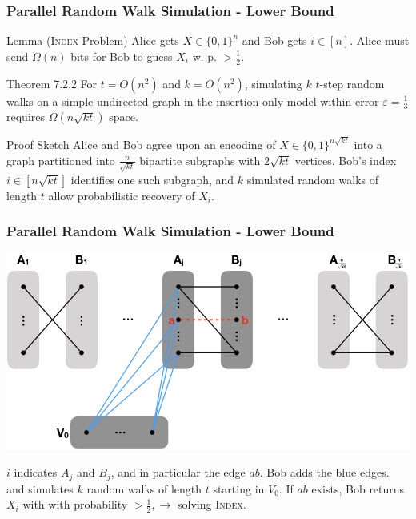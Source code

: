 \documentclass{beamer}
\newcommand{\algoname}[1]{\textnormal{\textsc{#1}}}
\begin{document}
\begin{frame}
\frametitle{Parallel Random Walk Simulation - Lower Bound}

\begin{block}{Lemma (\algoname{Index} Problem)}
Alice gets $X \in \{0,1\}^n$ and Bob gets $i \in [n]$.
Alice must send $\Omega(n)$ bits for Bob to guess $X_i$ w. p. $>\frac{1}{2}$.
\end{block}

\begin{block}{Theorem 7.2.2}
For $t = O(n^2)$ and $k = O(n^2)$, simulating $k$ $t$-step random walks on a simple undirected graph in the insertion-only model within error $\varepsilon = \frac{1}{3}$ requires $\Omega(n\sqrt{kt})$ space.
\end{block}

\begin{block}{Proof Sketch}
Alice and Bob agree upon an encoding of $X \in \{0,1\}^{n\sqrt{kt}}$ into a graph partitioned into $\frac{n}{\sqrt{kt}}$ bipartite subgraphs with $2\sqrt{kt}$ vertices.
Bob's index $i \in \left [ n\sqrt{kt} \right ]$ identifies one such subgraph, and $k$ simulated random walks of length $t$ allow probabilistic recovery of $X_i$.
\end{block}




\end{frame}




\begin{frame}
\frametitle{Parallel Random Walk Simulation - Lower Bound}


\centerline{\includegraphics[width=0.9\columnwidth]{lower_bound_proof}}

\begin{block}{}
	\begin{center}
		$i$ indicates $A_j$ and $B_j$, and in particular the edge $ab$.
		Bob adds the blue edges. and simulates $k$ random walks of length $t$ starting in $V_0$. 
		If $ab$ exists, Bob returns $X_i$ with with probability $> \frac{1}{2}, \rightarrow$ solving \algoname{Index}.
	\end{center}
\end{block}




\end{frame}
\end{document}
